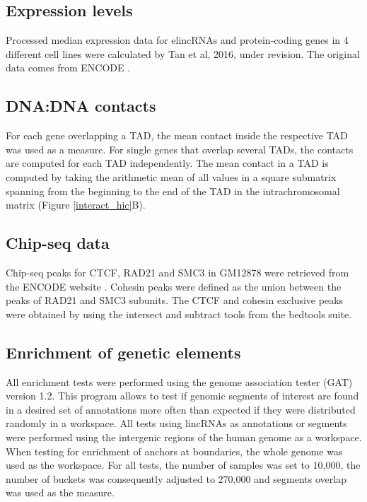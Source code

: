 \documentclass[11pt,a4paper]{report}
\begin{document}
\subsection*{Expression levels}

Processed median expression data for elincRNAs and protein-coding genes in 4  different cell lines were calculated by Tan et al, 2016, under revision. The original data comes from ENCODE \cite{ENCODEProject2012}.

\subsection*{DNA:DNA contacts}

For each gene overlapping a TAD, the mean contact inside the respective TAD was used as a measure. For single genes that overlap several TADs, the contacts are computed for each TAD independently. The mean contact in a TAD is computed by taking the arithmetic mean of all values in a square submatrix spanning from the beginning to the end of the TAD in the intrachromosomal matrix (Figure \ref{interact_hic}B).

\subsection*{Chip-seq data}

Chip-seq peaks for CTCF, RAD21 and SMC3 in GM12878 were retrieved from the ENCODE website \cite{ENCODEProject2012}⁠. Cohesin peaks were defined as the union between the peaks of RAD21 and SMC3 subunits. The CTCF and cohesin exclusive peaks were obtained by using the intersect and subtract tools from the bedtools suite.

\subsection*{Enrichment of genetic elements}

All enrichment tests were performed using the genome association tester (GAT) \cite{Heger2013}⁠ version 1.2. This program allows to test if genomic segments of interest are found in a desired set of annotations more often than expected if they were distributed randomly in a workspace. All tests using lincRNAs as annotations or segments were performed using the intergenic regions of the human genome as a workspace. When testing for enrichment of anchors at boundaries, the whole genome was used as the workspace. For all tests, the number of samples was set to 10,000, the number of buckets was consequently adjusted to 270,000 and segments overlap was used as the measure.
\end{document}
